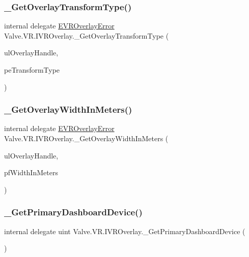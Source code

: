 \subsubsection{\texorpdfstring{\_GetOverlayTransformType()}{\_GetOverlayTransformType()}}
{\footnotesize\ttfamily internal delegate \mbox{\hyperlink{namespace_valve_1_1_v_r_aaee5c5144f42b7969d45b854f51b0c18}{E\+V\+R\+Overlay\+Error}} Valve.\+V\+R.\+I\+V\+R\+Overlay.\+\_\+\+Get\+Overlay\+Transform\+Type (\begin{DoxyParamCaption}\item[{ulong}]{ul\+Overlay\+Handle,  }\item[{ref \mbox{\hyperlink{namespace_valve_1_1_v_r_a92803c040c9ae49e1263b22b4d57d5fb}{V\+R\+Overlay\+Transform\+Type}}}]{pe\+Transform\+Type }\end{DoxyParamCaption})}

\mbox{\label{struct_valve_1_1_v_r_1_1_i_v_r_overlay_a428a94d317b358800d0bb78217345815}} 
\subsubsection{\texorpdfstring{\_GetOverlayWidthInMeters()}{\_GetOverlayWidthInMeters()}}
{\footnotesize\ttfamily internal delegate \mbox{\hyperlink{namespace_valve_1_1_v_r_aaee5c5144f42b7969d45b854f51b0c18}{E\+V\+R\+Overlay\+Error}} Valve.\+V\+R.\+I\+V\+R\+Overlay.\+\_\+\+Get\+Overlay\+Width\+In\+Meters (\begin{DoxyParamCaption}\item[{ulong}]{ul\+Overlay\+Handle,  }\item[{ref float}]{pf\+Width\+In\+Meters }\end{DoxyParamCaption})}

\mbox{\label{struct_valve_1_1_v_r_1_1_i_v_r_overlay_ad8a44528c5a3aefe931435586391a25c}} 
\subsubsection{\texorpdfstring{\_GetPrimaryDashboardDevice()}{\_GetPrimaryDashboardDevice()}}
{\footnotesize\ttfamily internal delegate uint Valve.\+V\+R.\+I\+V\+R\+Overlay.\+\_\+\+Get\+Primary\+Dashboard\+Device (\begin{DoxyParamCaption}{ }\end{DoxyParamCaption})}

